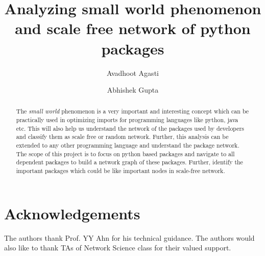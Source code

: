 \documentclass[sigconf]{acmart}
\begin{document}
\title{Analyzing small world phenomenon and scale free network of python packages}

\author{Avadhoot Agasti}

\author{Abhishek Gupta}

\begin{abstract}

The \textit{small world} phenomenon is a very important and interesting concept which can be practically 
used in optimizing imports for programming languages like python, java etc. This will also help us understand
the network of the packages used by developers and classify them as scale free or random network. Further,
this analysis can be extended to any other programming language and understand the package network. The 
scope of this project is to focus on python based packages and navigate to all dependent packages to build
a network graph of these packages. Further, identify the important packages which could be like important
nodes in scale-free network.   
\end{abstract}



\maketitle






%

%



\section{Acknowledgements}
 The authors thank Prof. YY Ahn for his technical guidance. The
 authors would also like to thank TAs of Network Science class for their valued
 support.



\end{document}

